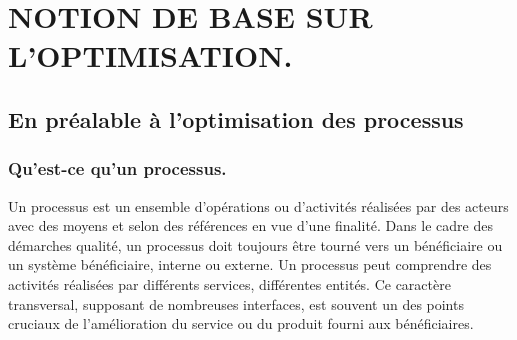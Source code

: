 \chapter {NOTION DE BASE SUR L’OPTIMISATION.}     %
\thispagestyle{fancy}
%



\section{En préalable à l’optimisation des processus }
	\subsection{Qu’est-ce qu’un processus.}
 Un processus \cite{Ref20} est un ensemble d'opérations ou d'activités réalisées par des acteurs avec des moyens et selon des références en vue d'une finalité. Dans le cadre des démarches qualité, un processus doit toujours être tourné vers un bénéficiaire ou un système bénéficiaire, interne ou externe.
Un processus peut comprendre des activités réalisées par différents services, différentes entités. Ce caractère transversal, supposant de nombreuses interfaces, est souvent un des points cruciaux de l'amélioration du service ou du produit fourni aux bénéficiaires. 

